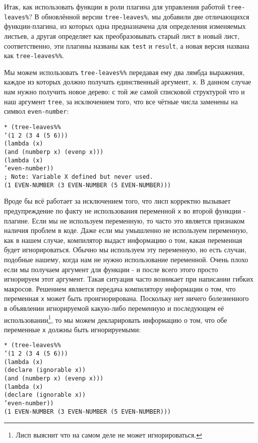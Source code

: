 Итак, как использовать функции в роли плагина для управления работой \verb"tree-leaves%"? В обновлённой версии \verb"tree-leaves%", мы добавили две отличающихся функции-плагина, из которых одна предназначена для определения изменяемых листьев, а другая определяет как преобразовывать старый лист в новый лист, соответственно, эти плагины названы как \verb"test" и \verb"result", а новая версия названа как \verb"tree-leaves%%".

Мы можем использовать \verb"tree-leaves%%" передавая ему два лямбда выражения, каждое из которых должно получать единственный аргумент, \verb"x". В данном случае нам нужно получить новое дерево: с той же самой списковой структурой что и наш аргумент \verb"tree", за исключением того, что все чётные числа заменены на символ \verb"even-number":

\begin{verbatim}
* (tree-leaves%%
’(1 2 (3 4 (5 6)))
(lambda (x)
(and (numberp x) (evenp x)))
(lambda (x)
’even-number))
; Note: Variable X defined but never used.
(1 EVEN-NUMBER (3 EVEN-NUMBER (5 EVEN-NUMBER)))
\end{verbatim}

Вроде бы всё работает за исключением того, что лисп корректно вызывает предупреждение по факту не использования переменной \verb"x" во второй функции - плагине. Если мы не используем переменную, то часто это является признаком наличия проблем в коде. Даже если мы умышленно не используем переменную, как в нашем случае, компилятор выдаст информацию о том, какая переменная будет игнорироваться. Обычно мы используем эту переменную, но есть случаи, подобные нашему, когда нам не нужно использование переменной. Очень плохо если мы получаем аргумент для функции - и после всего этого просто игнорируем этот аргумент. Такая ситуация часто возникает при написании гибких макросов. Решением является передача компилятору информации о том, что переменная \verb"x" может быть проигнорирована. Поскольку нет ничего болезненного в объявлении игнорируемой какую-либо переменную и последующем её использовании\footnote{Лисп выяснит что на самом деле не может игнорироваться.}, то мы можем декларировать информацию о том, что обе переменные \verb"x" должны быть игнорируемыми:



\begin{verbatim}
* (tree-leaves%%
’(1 2 (3 4 (5 6)))
(lambda (x)
(declare (ignorable x))
(and (numberp x) (evenp x)))
(lambda (x)
(declare (ignorable x))
’even-number))
(1 EVEN-NUMBER (3 EVEN-NUMBER (5 EVEN-NUMBER)))
\end{verbatim}

